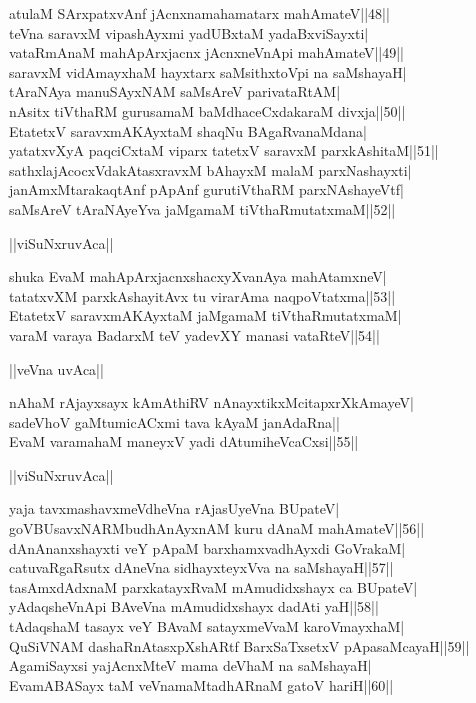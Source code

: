 \documentclass{article}
\begin{document}
atulaM SArxpatxvAnf jAcnxnamahamatarx mahAmateV||48||\\
teVna saravxM vipashAyxmi yadUBxtaM yadaBxviSayxti|\\
vataRmAnaM mahApArxjacnx jAcnxneVnApi mahAmateV||49||\\
saravxM vidAmayxhaM hayxtarx saMsithxtoVpi na saMshayaH|\\
tAraNAya manuSAyxNAM saMsAreV parivataRtAM|\\
nAsitx tiVthaRM gurusamaM baMdhaceCxdakaraM divxja||50||\\
EtatetxV saravxmAKAyxtaM shaqNu BAgaRvanaMdana|\\
yatatxvXyA paqciCxtaM viparx tatetxV saravxM parxkAshitaM||51||\\
sathxlajAcocxVdakAtasxravxM bAhayxM malaM parxNashayxti|\\
janAmxMtarakaqtAnf pApAnf gurutiVthaRM parxNAshayeVtf|\\
saMsAreV tAraNAyeYva jaMgamaM tiVthaRmutatxmaM||52||\\

\begin{center}
||viSuNxruvAca||
\end{center}

shuka EvaM mahApArxjacnxshacxyXvanAya mahAtamxneV|\\
tatatxvXM parxkAshayitAvx tu virarAma naqpoVtatxma||53||\\
EtatetxV saravxmAKAyxtaM jaMgamaM tiVthaRmutatxmaM|\\
varaM varaya BadarxM teV yadevXY manasi vataRteV||54||\\

\begin{center}
||veVna uvAca||
\end{center}

nAhaM rAjayxsayx kAmAthiRV nAnayxtikxMcitapxrXkAmayeV|\\
sadeVhoV gaMtumicACxmi tava kAyaM janAdaRna||\\
EvaM varamahaM maneyxV yadi dAtumiheVcaCxsi||55||\\

\begin{center}
||viSuNxruvAca||
\end{center}

yaja tavxmashavxmeVdheVna rAjasUyeVna BUpateV|\\
goVBUsavxNARMbudhAnAyxnAM kuru dAnaM mahAmateV||56||\\
dAnAnanxshayxti veY pApaM barxhamxvadhAyxdi GoVrakaM|\\
catuvaRgaRsutx dAneVna sidhayxteyxVva na saMshayaH||57||\\
tasAmxdAdxnaM parxkatayxRvaM mAmudidxshayx ca BUpateV|\\
yAdaqsheVnApi BAveVna mAmudidxshayx dadAti yaH||58||\\
tAdaqshaM tasayx veY BAvaM satayxmeVvaM karoVmayxhaM|\\
QuSiVNAM dashaRnAtasxpXshARtf BarxSaTxsetxV pApasaMcayaH||59||\\
AgamiSayxsi yajAcnxMteV mama deVhaM na saMshayaH|\\
EvamABASayx taM veVnamaMtadhARnaM gatoV hariH||60||
\end{document}
